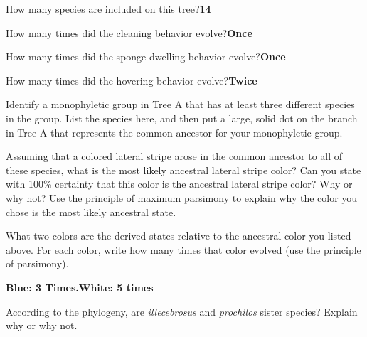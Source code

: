 \documentclass[11pt, addpoints]{exam}
\begin{document}
\begin{questions}

\question[1]
How many species are included on this tree?\ifprintanswers\quad\textbf{14}\fi


\question[1]
How many times did the cleaning behavior evolve?\ifprintanswers\quad\textbf{Once}\fi


\question[1]
How many times did the sponge-dwelling behavior evolve?\ifprintanswers\quad\textbf{Once}\fi


\question[1]
How many times did the hovering behavior evolve?\ifprintanswers\quad\textbf{Twice}\fi


\question[2]
Identify a monophyletic group in Tree A that has at least three
different species in the group. List the species here, and then put a
large, solid dot on the branch in Tree A that represents the common
ancestor for your monophyletic group.


\newpage

\question[2]
Assuming that a colored lateral stripe arose in the common ancestor
to all of these species, what is the most likely ancestral lateral
stripe color? Can you state with 100\% certainty that this color is the
ancestral lateral stripe color? Why or why not? Use the principle of
maximum parsimony to explain why the color you chose is the most likely
ancestral state.


\question[1]
What two colors are the derived states relative to the ancestral
color you listed above. For each color, write how many times that color
evolved (use the principle of parsimony).

\ifprintanswers\quad\textbf{Blue: 3 Times.}\quad\textbf{White: 5 times}\fi


\question[2]
According to the phylogeny, are \emph{illecebrosus} and
\emph{prochilos} sister species? Explain why or why not.


\end{questions}
\end{document}
